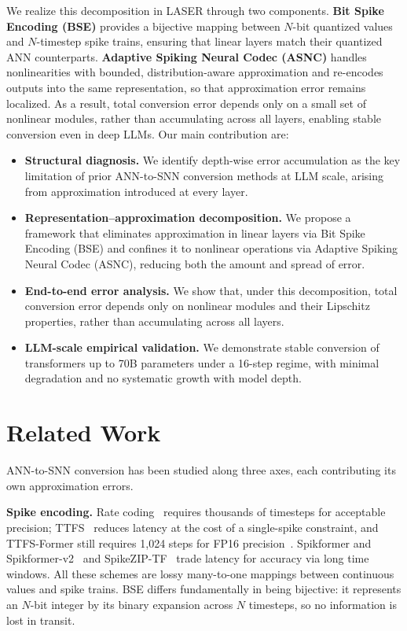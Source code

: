 \documentclass{article}
\theoremstyle{plain}
\theoremstyle{definition}
\theoremstyle{remark}
\begin{document}
We realize this decomposition in LASER through two components. \textbf{Bit Spike Encoding (BSE)} provides a bijective mapping between $N$-bit quantized values and $N$-timestep spike trains, ensuring that linear layers match their quantized ANN counterparts. \textbf{Adaptive Spiking Neural Codec (ASNC)} handles nonlinearities with bounded, distribution-aware approximation and re-encodes outputs into the same representation, so that approximation error remains localized. As a result, total conversion error depends only on a small set of nonlinear modules, rather than accumulating across all layers, enabling stable conversion even in deep LLMs. Our main contribution are:
\begin{itemize}
  \item \textbf{Structural diagnosis.}
  We identify depth-wise error accumulation as the key limitation of prior ANN-to-SNN conversion methods at LLM scale, arising from approximation introduced at every layer.

  \item \textbf{Representation–approximation decomposition.}
  We propose a framework that eliminates approximation in linear layers via Bit Spike Encoding (BSE) and confines it to nonlinear operations via Adaptive Spiking Neural Codec (ASNC), reducing both the amount and spread of error.

  \item \textbf{End-to-end error analysis.}
  We show that, under this decomposition, total conversion error depends only on nonlinear modules and their Lipschitz properties, rather than accumulating across all layers.

  \item \textbf{LLM-scale empirical validation.}
  We demonstrate stable conversion of transformers up to 70B parameters under a 16-step regime, with minimal degradation and no systematic growth with model depth.
\end{itemize}

\section{Related Work}
\label{sec:related_works}

ANN-to-SNN conversion has been studied along three axes, each contributing its
own approximation errors.

\noindent\textbf{Spike encoding.}
Rate coding~\citep{rueckauer2017conversion,auge2021encoding,guo2021coding}
requires thousands of timesteps for acceptable precision; TTFS~%
\citep{bonilla2022ttfs,stanojevic2024ttfs} reduces latency at the cost of a
single-spike constraint, and TTFS-Former still requires 1{,}024 steps for FP16
precision~\citep{ZhaoHuangDingYu2025_TTFSFormer}. Spikformer and
Spikformer-v2~\citep{zhou2023spikformer,zhou2024spikformerv2} and
SpikeZIP-TF~\citep{you2024spikeziptf} trade latency for accuracy via long time
windows. All these schemes are lossy many-to-one mappings between continuous
values and spike trains. BSE differs fundamentally in being bijective: it
represents an $N$-bit integer by its binary expansion across $N$ timesteps, so
no information is lost in transit.
\end{document}
